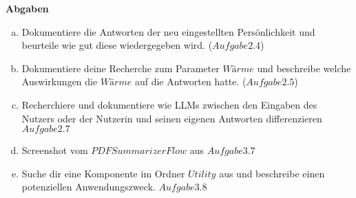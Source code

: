 \documentclass[12pt,ngerman]{AssignmentClass}
\begin{document}
\textbf{Abgaben}
\begin{enumerate}[a)]
\item Dokumentiere die Antworten der neu eingestellten Persönlichkeit und beurteile wie gut diese wiedergegeben wird. ($Aufgabe 2.4$) 								
\item Dokumentiere deine Recherche zum Parameter $Wärme$ und beschreibe welche Auswirkungen die $Wärme$ auf die Antworten hatte.  ($Aufgabe 2.5$)
\item Recherchiere und dokumentiere wie LLMs zwischen den Eingaben des Nutzers oder der Nutzerin und seinen eigenen Antworten differenzieren  $Aufgabe 2.7$ 
\item Screenshot vom $PDF Summarizer Flow$ aus $Aufgabe 3.7$
\item Suche dir eine Komponente im Ordner $Utility$ aus und beschreibe einen potenziellen Anwendungszweck. $Aufgabe 3.8$
\end{enumerate}
\end{document}
